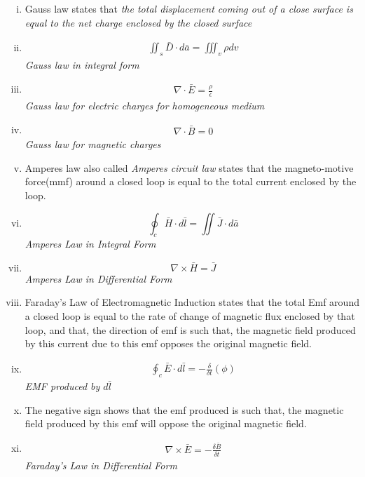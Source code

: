 \begin{enumerate}[(i)]
\item Gauss law states that \emph{the total displacement coming out of a close surface is equal to the net charge enclosed by the closed surface}

\item \begin{align*}
\iint_s\bar{D}\cdot{d\bar{a}} = \iiint_v\rho dv
\end{align*}
\emph{Gauss law in integral form}

\item \begin{align*} 
\nabla \cdot \bar{E} = \frac{\rho}{\epsilon}
\end{align*} 
\emph{Gauss law for electric charges for homogeneous medium}

\item \begin{align*}
\nabla \cdot \bar{B} = 0
\end{align*}
\emph{Gauss law for magnetic charges}

\item Amperes law also called \emph{Amperes circuit law} states that the magneto-motive force(mmf) around a closed loop is equal to the total current enclosed by the loop.

\item \begin{equation*}
\oint_c\bar{H} \cdot d\bar{l} = \iint\bar{J} \cdot d\bar{a}
\end{equation*}
\emph{Amperes Law in Integral Form}

\item \begin{equation*}
\boxed{\nabla \times \bar{H} = \bar{J}}
\end{equation*}
\emph{Amperes Law in Differential Form}

\item Faraday's Law of Electromagnetic Induction states that the total Emf around a closed loop is equal to the rate of change of magnetic flux enclosed by that loop, and that, the direction of emf is such that, the magnetic field produced by this current due to this emf opposes the original magnetic field. 

\item \begin{align*}
\oint_c\bar{E} \cdot d\bar{l} = -\frac{\delta}{\delta t}(\phi)
\end{align*}
\emph{EMF produced by $d\bar{l}$}

\item The negative sign shows that the emf produced is such that, the magnetic field produced by this emf will oppose the original magnetic field. 

\item 
\begin{align*}
\nabla \times \bar{E} = -\frac{\delta \bar{B}}{\delta t}
\end{align*}
\emph{Faraday's Law in Differential Form}
\end{enumerate}

